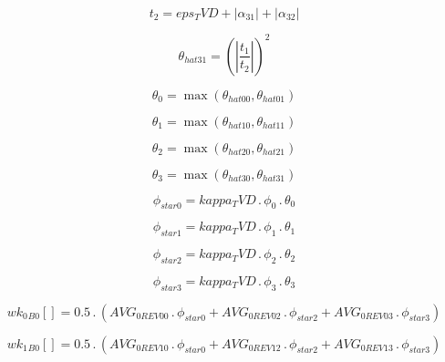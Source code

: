 \documentclass{article}
\begin{document}
\begin{dmath}t_{2} = eps_TVD + \left|{\alpha_{31}}\right| + \left|{\alpha_{32}}\right|\end{dmath}

\begin{dmath}\theta_{hat 31} = \left(\left|{\frac{t_{1}}{t_{2}}}\right| \right)^{2}\end{dmath}

\begin{dmath}\theta_{0} = \max\left(\theta_{hat 00}, \theta_{hat 01}\right)\end{dmath}

\begin{dmath}\theta_{1} = \max\left(\theta_{hat 10}, \theta_{hat 11}\right)\end{dmath}

\begin{dmath}\theta_{2} = \max\left(\theta_{hat 20}, \theta_{hat 21}\right)\end{dmath}

\begin{dmath}\theta_{3} = \max\left(\theta_{hat 30}, \theta_{hat 31}\right)\end{dmath}

\begin{dmath}\phi_{star 0} = kappa_TVD \,.\, \phi_{0} \,.\, \theta_{0}\end{dmath}

\begin{dmath}\phi_{star 1} = kappa_TVD \,.\, \phi_{1} \,.\, \theta_{1}\end{dmath}

\begin{dmath}\phi_{star 2} = kappa_TVD \,.\, \phi_{2} \,.\, \theta_{2}\end{dmath}

\begin{dmath}\phi_{star 3} = kappa_TVD \,.\, \phi_{3} \,.\, \theta_{3}\end{dmath}

\begin{dmath}{wk_{0}{_{B0}}}[{}] = 0.5 \,.\, \left(AVG_{0 REV 00} \,.\, \phi_{star 0} + AVG_{0 REV 02} \,.\, \phi_{star 2} + AVG_{0 REV 03} \,.\, \phi_{star 3}\right)\end{dmath}

\begin{dmath}{wk_{1}{_{B0}}}[{}] = 0.5 \,.\, \left(AVG_{0 REV 10} \,.\, \phi_{star 0} + AVG_{0 REV 12} \,.\, \phi_{star 2} + AVG_{0 REV 13} \,.\, \phi_{star 3}\right)\end{dmath}
\end{document}
